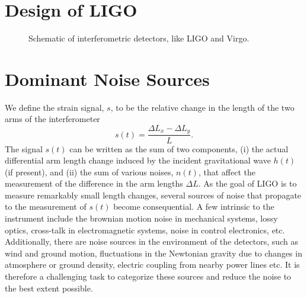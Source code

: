 
\section{Design of LIGO}\label{sec:ligo_construction}
\begin{figure}
 \begin{center}
 \end{center}
\label{fig:ligo}
\caption{Schematic of interferometric detectors, like LIGO and Virgo.}
\end{figure}



\section{Dominant Noise Sources}\label{sec:ligo_noise}

We define the strain signal, $s$, to be the relative change in the length 
of the two arms of the interferometer
% 
\begin{equation}
 s(t) = \dfrac{\Delta L_x - \Delta L_y}{L}.
\end{equation}
% 
The signal $s(t)$ can be written as the sum of two components, (i) the actual
differential arm length change induced by the incident gravitational wave 
$h(t)$ (if present), and (ii) the sum of various noises, $n(t)$, that affect 
the measurement of the difference in the arm lengths $\Delta L$. 
%
As the goal of LIGO is to measure remarkably small length changes, several
sources of noise that propagate to the measurement of $s(t)$ become 
consequential. A few intrinsic to the instrument include the brownian motion
noise in mechanical systems, lossy optics, cross-talk in electromagnetic
systems, noise in control electronics, etc. Additionally, there are noise 
sources in the environment of the detectors, such as wind and ground motion,
fluctuations in the Newtonian gravity due to changes in atmosphere or ground
density, electric coupling from nearby power lines etc. 
%
It is therefore a challenging task to categorize these sources and reduce the
noise to the best extent possible.


